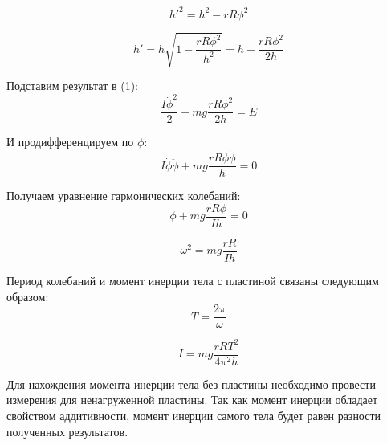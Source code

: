 \documentclass{article}
\begin{document}
    \begin{equation}
        h'^2 = h^2 - rR\phi^2
    \end{equation}

    \begin{equation}
        h' = h \sqrt {1 - \frac {rR\phi^2} {h^2}} = h - \frac {rR\phi^2} {2h}
    \end{equation}

    Подставим результат в (1):
    \begin{equation}
        \frac {I \dot \phi^2} {2} + mg \frac {rR\phi^2} {2h} = E
    \end{equation}

    И продифференцируем по $\phi$:
    \begin{equation}
        I \dot \phi \ddot \phi + mg \frac {rR \phi \dot \phi} {h} = 0
    \end{equation}

    Получаем уравнение гармонических колебаний:
    \begin{equation}
        \ddot \phi + mg \frac {rR \phi} {Ih} = 0
    \end{equation}
    
    \begin{equation}
        \omega ^ 2 = mg \frac {rR} {Ih}
    \end{equation}
    
    Период колебаний и момент инерции тела с пластиной связаны следующим образом:
    \begin{equation*}
        T = \frac {2 \pi} {\omega}
    \end{equation*}

    \begin{equation}
        I = mg \frac {rRT^2} {4 \pi^2 h}
    \end{equation}

    Для нахождения момента инерции тела без пластины необходимо провести измерения для ненагруженной пластины.
    Так как момент инерции обладает свойством аддитивности, момент инерции самого тела будет равен разности полученных
    результатов.
\end{document}
